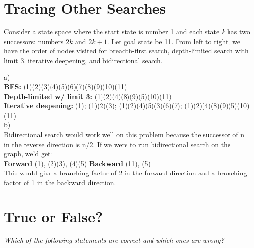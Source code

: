 \documentclass{article}
\begin{document}
\section{Tracing Other Searches}
Consider a state space where the start state is number 1 and each state \textit{k} has two successors: numbers $2k$ and $2k+1$. Let goal state be 11. From left to right, we have the order of nodes visited for breadth-first search, depth-limited search with limit 3, iterative deepening, and bidirectional search.
\begin{center}
\end{center}
a)\\ \textbf{BFS:} (1)(2)(3)(4)(5)(6)(7)(8)(9)(10)(11)
\\
\textbf{Depth-limited w/ limit 3:} (1)(2)(4)(8)(9)(5)(10)(11)
\\
\textbf{Iterative deepening:} (1); (1)(2)(3); (1)(2)(4)(5)(3)(6)(7); (1)(2)(4)(8)(9)(5)(10)(11)
\\
b)\\ Bidirectional search would work well on this problem because the successor of n in the reverse direction is n/2. If we were to run bidirectional search on the graph, we'd get:
\\
\textbf{Forward} (1), (2)(3), (4)(5)
\textbf{Backward} (11), (5)
\\
This would give a branching factor of 2 in the forward direction and a branching factor of 1 in the backward direction.

\section{True or False?}
\textit{Which of the following statements are correct and which ones are wrong?}
\end{document}

